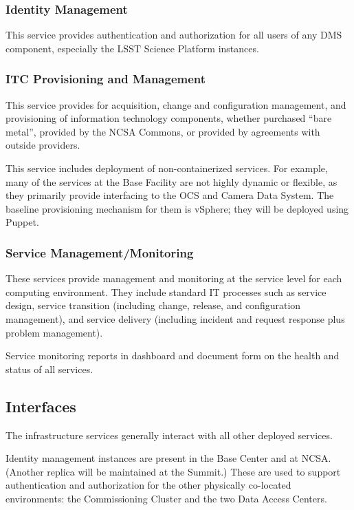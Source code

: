 \documentclass[DM,toc]{lsstdoc}
\begin{document}
\subsubsection{Identity Management}\label{identity-management}

This service provides authentication and authorization for all users of
any DMS component, especially the LSST Science Platform instances.

\subsubsection{ITC Provisioning and Management}\label{itc-provisioning-management}

This service provides for acquisition, change and configuration management, and provisioning of information technology components, whether purchased ``bare metal'', provided by the NCSA Commons, or provided by agreements with outside providers.

This service includes deployment of non-containerized services.
For example, many of the services at the Base Facility are not highly dynamic or flexible, as they primarily provide interfacing to the OCS and Camera Data System.
The baseline provisioning mechanism for them is vSphere; they will be deployed using Puppet.

\subsubsection{Service Management/Monitoring}\label{service-management-monitoring}

These services provide management and monitoring at the service level for each computing environment.
They include standard IT processes such as service design, service transition (including change, release, and configuration management), and service delivery (including incident and request response plus problem management).

Service monitoring reports in dashboard and document form on the health and status of all services.

\subsection{Interfaces}\label{infrastructure-interfaces}

The infrastructure services generally interact with all other deployed
services.

Identity management instances are present in the Base Center and at NCSA.
(Another replica will be maintained at the Summit.)  These are used to support
authentication and authorization for the other physically co-located environments:
the Commissioning Cluster and the two Data Access Centers.
\end{document}
